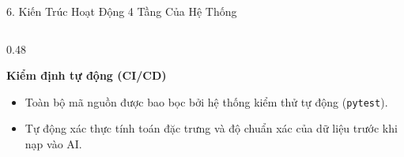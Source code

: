 \documentclass[aspectratio=169, 10pt]{beamer}
\begin{document}
\begin{frame}{6. Kiến Trúc Hoạt Động 4 Tầng Của Hệ Thống}
\begin{columns}[t]
    \begin{column}{0.48\textwidth}
      \begin{block}{\textbf{Kiểm định tự động (CI/CD)}}
        \footnotesize
        \begin{itemize}
          \item Toàn bộ mã nguồn được bao bọc bởi hệ thống kiểm thử tự động (\texttt{pytest}).
          \item Tự động xác thực tính toán đặc trưng và độ chuẩn xác của dữ liệu trước khi nạp vào AI.
        \end{itemize}
      \end{block}
    \end{column}
  \end{columns}
\end{frame}

\end{document}
